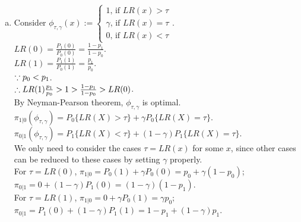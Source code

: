 \begin{pr}$ $
\newcommand{\w}{{\overline\omega}}
\begin{enumerate}[(a)]
\item Consider $\phi_{\tau, \gamma}(x):=\begin{cases}
1\text{, if }LR(x)>\tau\\
\gamma\text{, if }LR(x)=\tau\\
0\text{, if }LR(x)<\tau
\end{cases}$.\\
$LR(0)=\frac{P_1(0)}{P_0(0)}=\frac{1-p_1}{1-p_0}$.\\
$LR(1)=\frac{P_1(1)}{P_0(1)}=\frac{p_1}{p_0}$.\\
$\because p_0<p_1$.\\
$\therefore LR(1)\frac{p_1}{p_0}>1>\frac{1-p_1}{1-p_0}>LR(0)$.\\
By Neyman-Pearson theorem, $\phi_{\tau, \gamma}$ is optimal.\\
$\pi_{1|0}(\phi_{\tau, \gamma})=P_0\{LR(X)>\tau\}+\gamma P_0\{LR(X)=\tau\}$.\\
$\pi_{0|1}(\phi_{\tau, \gamma})=P_1\{LR(X)<\tau\}+(1-\gamma)P_1\{LR(X)=\tau\}$.\\
We only need to consider the cases $\tau=LR(x)$ for some $x$, since other cases can be reduced to these cases by setting $\gamma$ properly.\\
For $\tau=LR(0)$, $\pi_{1|0}=P_0(1)+\gamma P_0(0)=p_0+\gamma(1-p_0)$; $\pi_{0|1}=0+(1-\gamma)P_1(0)=(1-\gamma)(1-p_1)$.\\
For $\tau=LR(1)$, $\pi_{1|0}=0+\gamma P_0(1)=\gamma p_0$; $\pi_{0|1}=P_1(0)+(1-\gamma)P_1(1)=1-p_1+(1-\gamma)p_1$.\\
\end{enumerate}
\end{pr}
